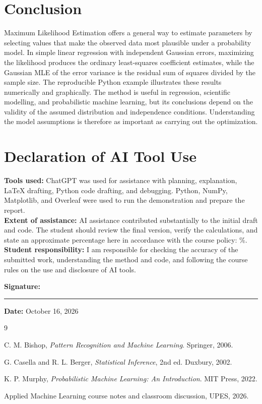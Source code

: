 \documentclass[11pt,a4paper]{article}
\begin{document}
\section{Conclusion}
Maximum Likelihood Estimation offers a general way to estimate parameters by selecting values that make the observed data most plausible under a probability model. In simple linear regression with independent Gaussian errors, maximizing the likelihood produces the ordinary least-squares coefficient estimates, while the Gaussian MLE of the error variance is the residual sum of squares divided by the sample size. The reproducible Python example illustrates these results numerically and graphically. The method is useful in regression, scientific modelling, and probabilistic machine learning, but its conclusions depend on the validity of the assumed distribution and independence conditions. Understanding the model assumptions is therefore as important as carrying out the optimization.

\section*{Declaration of AI Tool Use}
\noindent\textbf{Tools used:} ChatGPT was used for assistance with planning, explanation, LaTeX drafting, Python code drafting, and debugging. Python, NumPy, Matplotlib, and Overleaf were used to run the demonstration and prepare the report.\\
\textbf{Extent of assistance:} AI assistance contributed substantially to the initial draft and code. The student should review the final version, verify the calculations, and state an approximate percentage here in accordance with the course policy: \underline{\hspace{1.4cm}}\%.\\
\textbf{Student responsibility:} I am responsible for checking the accuracy of the submitted work, understanding the method and code, and following the course rules on the use and disclosure of AI tools.

\vspace{0.8cm}
\noindent\textbf{Signature:} \rule{4cm}{0.4pt}\hfill
\textbf{Date:} October 16, 2026

\clearpage
\begin{thebibliography}{9}
C. M. Bishop, \emph{Pattern Recognition and Machine Learning}. Springer, 2006.

G. Casella and R. L. Berger, \emph{Statistical Inference}, 2nd ed. Duxbury, 2002.

K. P. Murphy, \emph{Probabilistic Machine Learning: An Introduction}. MIT Press, 2022.

Applied Machine Learning course notes and classroom discussion, UPES, 2026.
\end{thebibliography}
\end{document}
